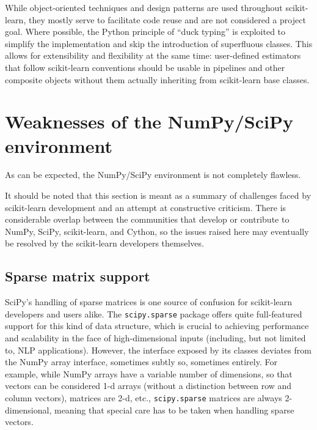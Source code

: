 \documentclass[a4paper,twocolumn]{article}
\begin{document}
While object-oriented techniques and design patterns
are used throughout scikit-learn,
they mostly serve to facilitate code reuse and are not considered a project goal.
Where possible, the Python principle of ``duck typing'' is exploited
to simplify the implementation and skip the introduction of superfluous classes.
This allows for extensibility and flexibility at the same time:
user-defined estimators that follow scikit-learn conventions
should be usable in pipelines and other composite objects
without them actually inheriting from scikit-learn base classes.

\section{Weaknesses of the NumPy/SciPy environment}

As can be expected, the NumPy/SciPy environment is not completely flawless.

It should be noted that this section is meant
as a summary of challenges faced by scikit-learn development
and an attempt at constructive criticism.
There is considerable overlap between the communities
that develop or contribute to NumPy, SciPy, scikit-learn, and Cython,
so the issues raised here may eventually be resolved
by the scikit-learn developers themselves.

\subsection{Sparse matrix support}

SciPy's handling of sparse matrices is one source of confusion
for scikit-learn developers and users alike.
The \texttt{scipy.sparse} package offers quite full-featured support
for this kind of data structure,
which is crucial to achieving performance and scalability
in the face of high-dimensional inputs
(including, but not limited to, NLP applications).
However, the interface exposed by its classes
deviates from the NumPy array interface, sometimes subtly so,
sometimes entirely.  %
For example, while NumPy arrays have a variable number of dimensions,
so that vectors can be considered 1-d arrays
(without a distinction between row and column vectors),
matrices are 2-d, etc., \texttt{scipy.sparse} matrices are always 2-dimensional,
meaning that special care has to be taken when handling sparse vectors.
\end{document}

